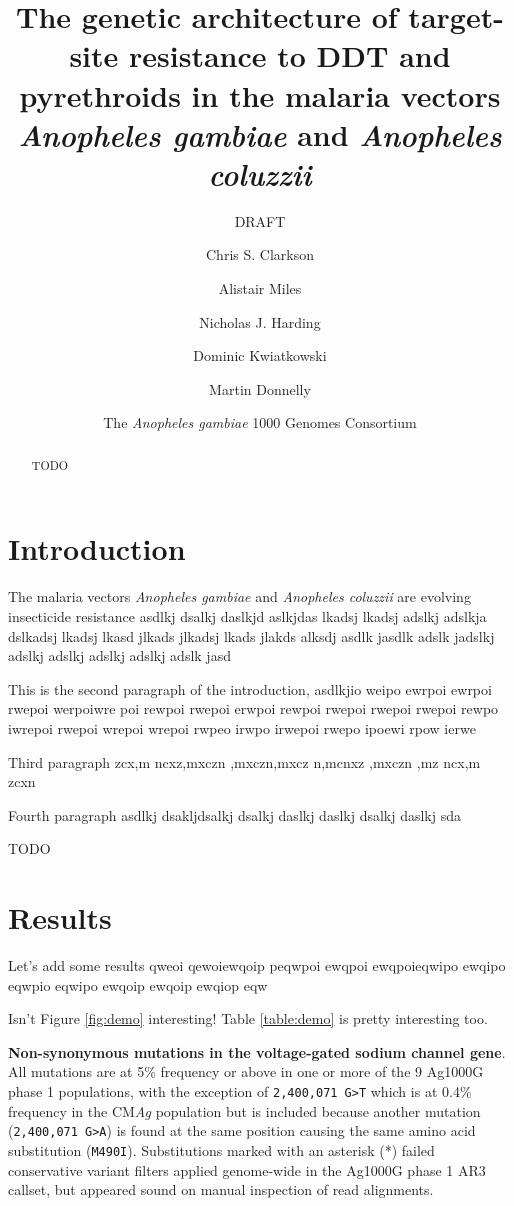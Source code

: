 \documentclass[a4paper,10pt,abstracton]{scrartcl}
\title{The genetic architecture of target-site resistance to DDT and
  pyrethroids in the malaria vectors \emph{Anopheles gambiae} and
  \emph{Anopheles coluzzii}}
\subtitle{DRAFT}
\author[1]{Chris S. Clarkson}
\author[2,1]{Alistair Miles}
\author[2]{Nicholas J. Harding}
\author[1,2]{Dominic Kwiatkowski}
\author[3,1]{Martin Donnelly}
\author[4]{The \emph{Anopheles gambiae} 1000 Genomes Consortium}
\affil[1]{Sanger @@TODO}
\affil[2]{Oxford @@TODO}
\affil[3]{Liverpool @@TODO}
\affil[4]{MalariaGEN @@TODO}
\begin{document}
\maketitle

\begin{abstract}

TODO

\end{abstract}

\section*{Introduction}

The malaria vectors \emph{Anopheles gambiae} and \emph{Anopheles
  coluzzii} are evolving insecticide resistance asdlkj dsalkj daslkjd
aslkjdas lkadsj lkadsj adslkj adslkja dslkadsj lkadsj lkasd jlkads
jlkadsj lkads jlakds alksdj asdlk jasdlk adslk jadslkj adslkj adslkj
adslkj adslkj adslk jasd

This is the second paragraph of the introduction, asdlkjio weipo
ewrpoi ewrpoi rwepoi werpoiwre poi rewpoi rwepoi erwpoi rewpoi rwepoi
rwepoi rwepoi rewpo iwrepoi rwepoi wrepoi wrepoi rwpeo irwpo irwepoi
rwepo ipoewi rpow ierwe

Third paragraph zcx,m ncxz,mxczn ,mxczn,mxcz n,mcnxz ,mxczn ,mz ncx,m
zcxn

Fourth paragraph asdlkj dsakljdsalkj dsalkj daslkj daslkj dsalkj
daslkj sda

TODO

\section*{Results}

Let's add some results qweoi qewoiewqoip peqwpoi ewqpoi ewqpoieqwipo
ewqipo eqwpio eqwipo ewqoip ewqoip ewqiop eqw

Isn't Figure \ref{fig:demo} interesting! Table \ref{table:demo} is
pretty interesting too.

\begin{landscape}
\begin{table}[h]
  \small
  \centering
  
  \caption{\textbf{Non-synonymous mutations in the voltage-gated
      sodium channel gene}. All mutations are at 5\% frequency or
    above in one or more of the 9 Ag1000G phase 1 populations, with
    the exception of \texttt{2,400,071 G>T} which is at 0.4\%
    frequency in the CM\emph{Ag} population but is included because
    another mutation (\texttt{2,400,071 G>A}) is found at the same
    position causing the same amino acid substitution
    (\texttt{M490I}). Substitutions marked with an asterisk (*) failed
    conservative variant filters applied genome-wide in the Ag1000G
    phase 1 AR3 callset, but appeared sound on manual inspection of
    read alignments.}
  \label{table:variants_missense}
\end{table}
\end{landscape}
\end{document}
